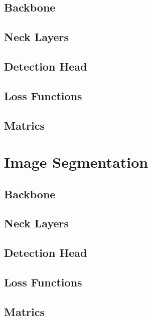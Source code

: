 \documentclass[a4paper]{article}
\begin{document}
\subsection{Backbone}

\subsection{Neck Layers}

\subsection{Detection Head}

\subsection{Loss Functions}

\subsection{Matrics}

\section{Image Segmentation}

\subsection{Backbone}

\subsection{Neck Layers}

\subsection{Detection Head}

\subsection{Loss Functions}

\subsection{Matrics}




\end{document}
